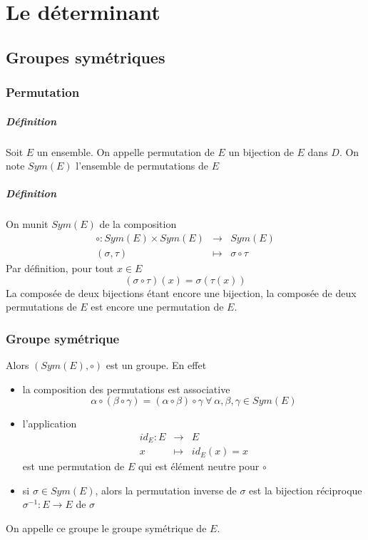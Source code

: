 \chapter{Le déterminant}

%
%
\section{Groupes symétriques}
%
%
%
\subsection{Permutation}
%
\paragraph{Définition} Soit $E$ un ensemble. On appelle permutation de $E$ un bijection  de $E$ dans $D$. On note $Sym(E)$ l'ensemble de permutations de $E$

\paragraph{Définition} On munit $Sym(E)$ de la composition
\begin{eqnarray*}
  \circ: Sym(E) \times Sym(E) &\rightarrow& Sym(E) \\
  (\sigma , \tau) &\mapsto& \sigma \circ \tau
\end{eqnarray*}
Par définition, pour tout $x\in E$
$$(\sigma \circ \tau)(x) = \sigma(\tau(x))$$
La composée de deux bijections étant encore une bijection, la composée de deux permutations de $E$ est encore une permutation de $E$.

%
\subsection{Groupe symétrique}
\label{sec:grp_sym}
%
Alors $(Sym(E), \circ)$ est un groupe. En effet
\begin{itemize}
  \item la composition des permutations est associative
    $$\alpha \circ (\beta \circ \gamma) = (\alpha \circ \beta) \circ \gamma ~ \forall ~ \alpha, \beta, \gamma \in Sym(E)$$
  
  \item l'application
    \begin{eqnarray*}
      id_E: E &\rightarrow& E \\
      x &\mapsto& id_E(x) = x 
    \end{eqnarray*}
    est une permutation de $E$ qui est élément neutre pour $\circ$
    
  \item si $\sigma \in Sym(E)$, alors la permutation inverse de $\sigma$ est la bijection réciproque $\sigma^{-1}: E \rightarrow E$ de $\sigma$
\end{itemize}
On appelle ce groupe le groupe symétrique de $E$.

